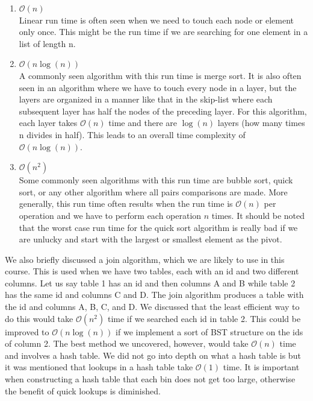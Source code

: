 \begin{enumerate}
    \item $\mathcal{O}(n)$ \\
    Linear run time is often seen when we need to touch each node or element only once. This might be the run time if we are searching for one element in a list of length n.
    
    \item $\mathcal{O}(n\log(n))$ \\
    
    A commonly seen algorithm with this run time is merge sort. It is also often seen in an algorithm where we have to touch every node in a layer, but the layers are organized in a manner like that in the skip-list where each subsequent layer has half the nodes of the preceding layer. For this algorithm, each layer takes $\mathcal{O}(n)$ time and there are $\log(n)$ layers (how many times n divides in half). This leads to an overall time complexity of $\mathcal{O}(n\log(n))$.
    
    \item $\mathcal{O}(n^2)$ \\
    
    Some commonly seen algorithms with this run time are bubble sort, quick sort, or any other algorithm where all pairs comparisons are made. More generally, this run time often results when the run time is $\mathcal{O}(n)$ per operation and we have to perform each operation $n$ times. It should be noted that the worst case run time for the quick sort algorithm is really bad if we are unlucky and start with the largest or smallest element as the pivot. \\
    
\end{enumerate}
    
We also briefly discussed a join algorithm, which we are likely to use in this course. This is used when we have two tables, each with an id and two different columns. Let us say table 1 has an id and then columns A and B while table 2 has the same id and columns C and D. The join algorithm produces a table with the id and columns A, B, C, and D. We discussed that the least efficient way to do this would take $\mathcal{O}(n^2)$ time if we searched each id in table 2. This could be improved to $\mathcal{O}(n\log(n))$ if we implement a sort of BST structure on the ids of column 2. The best method we uncovered, however, would take $\mathcal{O}(n)$ time and involves a hash table. We did not go into depth on what a hash table is but it was mentioned that lookups in a hash table take $\mathcal{O}(1)$ time. It is important when constructing a hash table that each bin does not get too large, otherwise the benefit of quick lookups is diminished.

